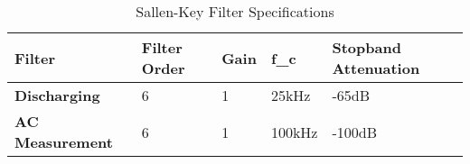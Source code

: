 \begin{table}[ht!]
\centering
\begin{tabular}{|l|l|l|l|l|}
\hline
{\bf Filter}         & {\bf Filter Order} & {\bf Gain} & {\bf f\_c} & {\bf Stopband Attenuation} \\ \hline
{\bf Discharging}    & 6                  & 1          & 25kHz      & -65dB                      \\ \hline
{\bf AC Measurement} & 6                  & 1          & 100kHz     & -100dB                     \\ \hline
\end{tabular}
\caption{Sallen-Key Filter Specifications}
\label{table:skey}
\end{table}

